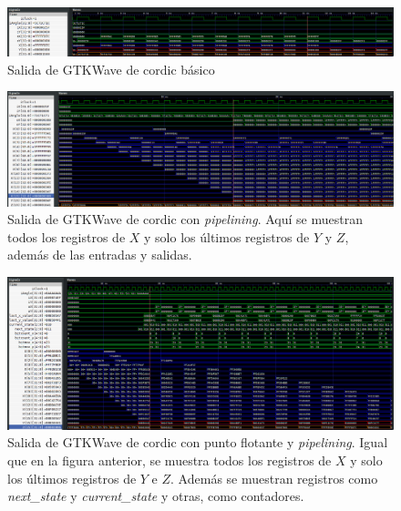 \begin{landscape} %
	\begin{figure}[ht]
		\centering
		\includegraphics[width=\paperwidth]{archivos/CORDIC/salida_gtkwave_basico.png}
		\caption{Salida de GTKWave de \gls{cordic} básico}
		\label{graf:salida_gtkwave_basico}
	\end{figure}
	\clearpage

	\begin{figure}[ht]
		\centering
		\includegraphics[width=\paperwidth]{archivos/CORDIC/salida_gtkwave_pipeline.png}
		\caption{Salida de GTKWave de \gls{cordic} con \textit{pipelining}. Aquí se muestran todos los registros de $X$ y solo los últimos registros de $Y$ y $Z$, además de las entradas y salidas.}
		\label{graf:salida_gtkwave_pipeline}
	\end{figure}
	\clearpage %
	
	\begin{figure}[ht]
	\centering
	\includegraphics[width=\paperwidth]{archivos/CORDIC/salida_gtkwave_fp2.png}
	\caption{Salida de GTKWave de \gls{cordic} con punto flotante y \textit{pipelining}. Igual que en la figura anterior, se muestra todos los registros de $X$ y solo los últimos registros de $Y$ e $Z$. Además se muestran registros como \textit{next\_state} y \textit{current\_state} y otras, como contadores.}
	\label{graf:salida_gtkwave_fp}
	\end{figure}
	\clearpage
	

	
\end{landscape} %

